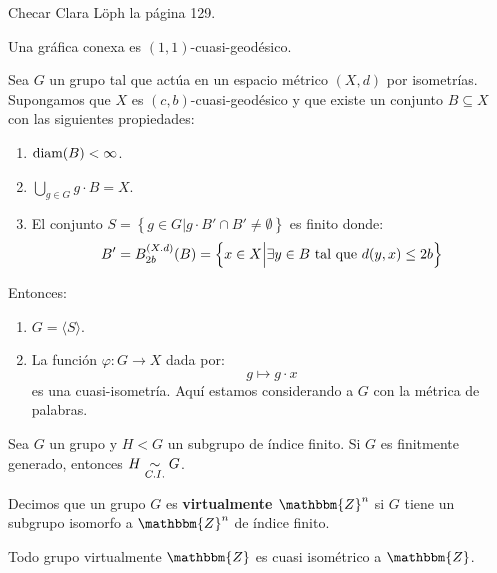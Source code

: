 \documentclass[12pt]{report}
\newcounter{it}
\theoremstyle{largebreak}
\newcommand\cf[3]{\ensuremath{#1:#2\rightarrow#3}}
\newcommand{\bbm}[1]{\ensuremath{\mathbbm{#1}}}
\newcommand{\gen}[1]{\ensuremath{\langle#1\rangle}}
\begin{document}
    Checar Clara Löph la página 129.

    \begin{propo}
        Una gráfica conexa es $(1,1)$-cuasi-geodésico.
    \end{propo}

    \begin{theor}
        Sea $G$ un grupo tal que actúa en un espacio métrico $(X,d)$ por isometrías. Supongamos que $X$ es $(c,b)$-cuasi-geodésico y que existe un conjunto $B\subseteq X$ con las siguientes propiedades:
        \begin{enumerate}[label = \textit{(\alph*)}]
            \item $\textup{diam}(B)<\infty$.
            \item $\bigcup_{ g\in G}g\cdot B=X$.
            \item El conjunto $S=\left\{g\in G\Big|g\cdot B'\cap B'\neq\emptyset \right\}$ es finito donde:
            \begin{equation*}
                B'=B_{ 2b}^{(X.d)}(B)=\left\{x\in X\Big|\exists y\in B\textup{ tal que }d(y,x)\leq 2b \right\}
            \end{equation*}
        \end{enumerate}
        Entonces:
        \begin{enumerate}[label = \textit{(\arabic*)}]
            \item $G=\gen{S}$.
            \item La función $\cf{\varphi}{G}{X}$ dada por:
            \begin{equation*}
                g\mapsto g\cdot x
            \end{equation*}
            es una cuasi-isometría. Aquí estamos considerando a $G$ con la métrica de palabras.
        \end{enumerate}
    \end{theor}

    \begin{cor}
        Sea $G$ un grupo y $H<G$ un subgrupo de índice finito. Si $G$ es finitmente generado, entonces $H\underset{C.I.}{\sim} G$. 
    \end{cor}

    \begin{mydef}
        Decimos que un grupo $G$ es \textbf{virtualmente $\bbm{Z}^n$} si $G$ tiene un subgrupo isomorfo a $\bbm{Z}^n$ de índice finito.
    \end{mydef}

    \begin{theor}
        Todo grupo virtualmente $\bbm{Z}$ es cuasi isométrico a $\bbm{Z}$.
    \end{theor}
\end{document}
